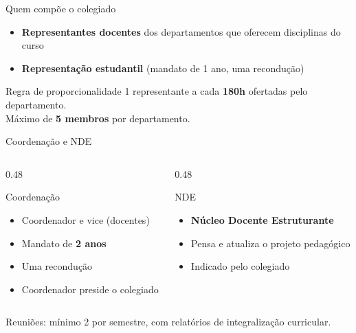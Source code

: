 \documentclass[aspectratio=169]{beamer}
\newcommand{\impt}[1]{\textcolor{maccent}{\textbf{#1}}}
\newcommand{\ntc}[1]{\textcolor{mprimary}{#1}}
\begin{document}
\begin{frame}{Quem compõe o colegiado}
  \begin{itemize}
    \item \impt{Representantes docentes} dos departamentos que oferecem disciplinas do curso
    \item \impt{Representação estudantil} (mandato de 1 ano, uma recondução)
  \end{itemize}

  \vspace{0.4cm}
   
  \begin{block}{Regra de proporcionalidade}
    1 representante a cada \impt{180h} ofertadas pelo departamento.\\
    Máximo de \impt{5 membros} por departamento.
  \end{block}
\end{frame}

\begin{frame}{Coordenação e NDE}
  \begin{columns}[T,onlytextwidth]
    \begin{column}{0.48\textwidth}
      \begin{block}{Coordenação}
        \begin{itemize}
          \item Coordenador e vice (docentes)
          \item Mandato de \impt{2 anos}
          \item Uma recondução
          \item Coordenador preside o colegiado
        \end{itemize}
      \end{block}
    \end{column}
    \begin{column}{0.48\textwidth}
      \begin{block}{NDE}
        \begin{itemize}
          \item \impt{Núcleo Docente Estruturante}
          \item Pensa e atualiza o projeto pedagógico
          \item Indicado pelo colegiado
        \end{itemize}
      \end{block}
    \end{column}
  \end{columns}

  \vspace{0.3cm}
   
  \ntc{Reuniões: mínimo 2 por semestre, com relatórios de integralização curricular.}
\end{frame}
\end{document}
